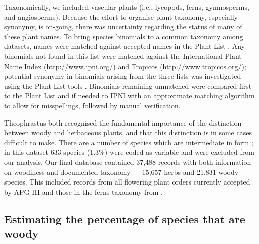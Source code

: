 \documentclass[a4paper,12pt]{article}
\begin{document}
Taxonomically, we included vascular plants (i.e., lycopods, ferns,
gymnosperms, and angiosperms).
%
Because the effort to organise plant taxonomy, especially synonymy, is
on-going, there was uncertainty regarding the status of many of these
plant names.  
%
To bring species binomials to a common taxonomy among datasets, names
were matched against accepted names in the Plant List
\citep{ThePlantList}.  Any binomials not found in this list were
matched against the International Plant Name Index
(http://www.ipni.org/) and Tropicos (http://www.tropicos.org/);
potential synonymy in binomials arising from the three lists was
investigated using the Plant List tools \citep{ThePlantList}.  
%
Binomials remaining unmatched were compared first to the Plant List
and if needed to IPNI with an approximate matching algorithm to allow
for misspellings, followed by manual verification.

Theophrastus both recognised the fundamental importance of the
distinction between woody and herbaceous plants, and that this
distinction is in some cases difficult to make.  There are a number of
species which are intermediate in form \citep{beaulieuHiddenRates}; in
this dataset 633 species (1.3\%) were coded as variable and were
excluded from our analysis.
%
Our final database contained 37,488 records with both information on
woodiness and documented taxonomy --- 15,657 herbs and 21,831 woody
species.  This included records from all flowering plant orders
currently accepted by APG-III \citep{APG3} and those in the ferns
taxonomy from \citet{apweb}.


\subsection{Estimating the percentage of species that are woody}
\end{document}

